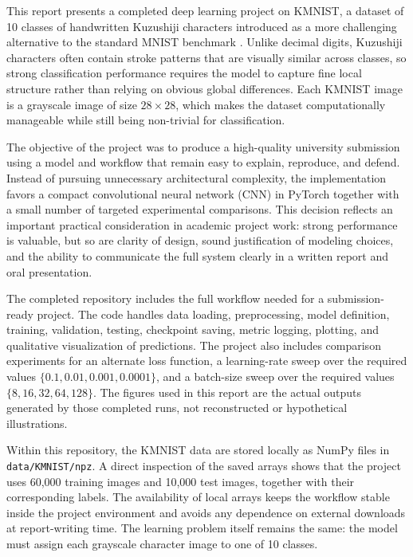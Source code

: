\documentclass[conference]{IEEEtran}
\begin{document}
This report presents a completed deep learning project on KMNIST, a dataset of 10 classes of handwritten Kuzushiji characters introduced as a more challenging alternative to the standard MNIST benchmark \cite{clanuwat2018}. Unlike decimal digits, Kuzushiji characters often contain stroke patterns that are visually similar across classes, so strong classification performance requires the model to capture fine local structure rather than relying on obvious global differences. Each KMNIST image is a grayscale image of size $28 \times 28$, which makes the dataset computationally manageable while still being non-trivial for classification.

The objective of the project was to produce a high-quality university submission using a model and workflow that remain easy to explain, reproduce, and defend. Instead of pursuing unnecessary architectural complexity, the implementation favors a compact convolutional neural network (CNN) in PyTorch \cite{paszke2019} together with a small number of targeted experimental comparisons. This decision reflects an important practical consideration in academic project work: strong performance is valuable, but so are clarity of design, sound justification of modeling choices, and the ability to communicate the full system clearly in a written report and oral presentation.

The completed repository includes the full workflow needed for a submission-ready project. The code handles data loading, preprocessing, model definition, training, validation, testing, checkpoint saving, metric logging, plotting, and qualitative visualization of predictions. The project also includes comparison experiments for an alternate loss function, a learning-rate sweep over the required values $\{0.1, 0.01, 0.001, 0.0001\}$, and a batch-size sweep over the required values $\{8, 16, 32, 64, 128\}$. The figures used in this report are the actual outputs generated by those completed runs, not reconstructed or hypothetical illustrations.

Within this repository, the KMNIST data are stored locally as NumPy files in \texttt{data/KMNIST/npz}. A direct inspection of the saved arrays shows that the project uses 60{,}000 training images and 10{,}000 test images, together with their corresponding labels. The availability of local arrays keeps the workflow stable inside the project environment and avoids any dependence on external downloads at report-writing time. The learning problem itself remains the same: the model must assign each grayscale character image to one of 10 classes.
\end{document}
